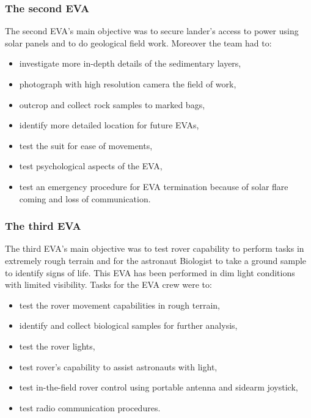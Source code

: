 \documentclass[preprint]{elsarticle}
\begin{document}
\subsubsection{The second EVA}
The second EVA's main objective was to secure lander's access to power using solar panels and to do geological field work. Moreover the team had to:
\begin{itemize}
\item investigate more in-depth details of the sedimentary layers,
\item photograph with high resolution camera the field of work,
\item outcrop and collect rock samples to marked bags,
\item identify more detailed location for future EVAs,
\item test the suit for ease of movements,
\item test psychological aspects of the EVA,
\item test an emergency procedure for EVA termination because of solar flare coming and loss of communication.
\end{itemize}

\subsubsection{The third EVA}
The third EVA's main objective was to test rover capability to perform tasks in extremely rough terrain and for the astronaut Biologist to take a ground sample to identify signs of life. This EVA has been performed in dim light conditions with limited visibility. Tasks for the EVA crew were to:
\begin{itemize}
\item test the rover movement capabilities in rough terrain,
\item identify and collect biological samples for further analysis,
\item test the rover lights,
\item test rover's capability to assist astronauts with light,
\item test in-the-field rover control using portable antenna and sidearm joystick,
\item test radio communication procedures.
\end{itemize}
\end{document}
